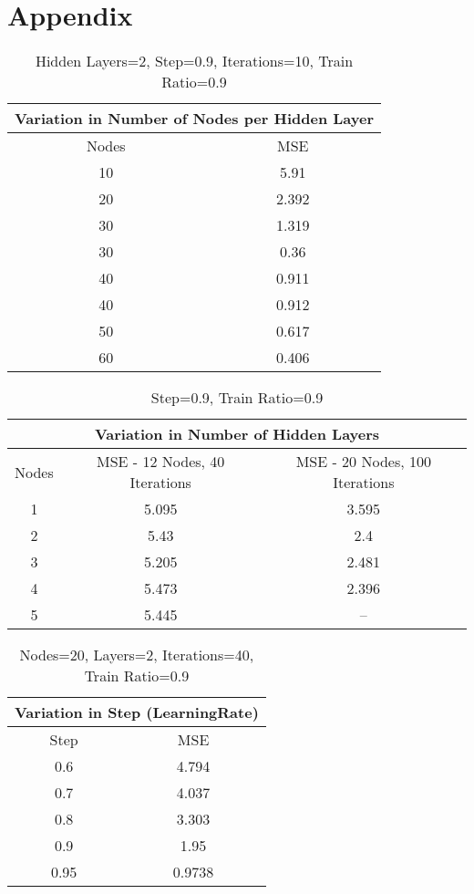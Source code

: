\documentclass[a4paper,11pt]{article}
\begin{document}
\section{Appendix}
\begin{table}
\centering
\begin{tabular}{|c|c|}
\hline
\multicolumn{2}{|c|}{Variation in Number of Nodes per Hidden Layer }\\
\hline
Nodes & MSE\\ 
\hline
10 & 5.91\\ 
\hline
20 & 2.392\\ 
\hline
30 & 1.319\\ 
\hline
30 & 0.36\\ 
\hline
40 & 0.911\\ 
\hline
40 & 0.912\\ 
\hline
50 & 0.617\\ 
\hline
60 & 0.406\\ 
\hline
\hline\end{tabular}
\label{table:table}
\caption{\small{Hidden Layers=2, Step=0.9, Iterations=10, Train Ratio=0.9 }} 
\end{table}


\begin{table}
\centering
\begin{tabular}{|c|c|c|}
\hline
\multicolumn{3}{|c|}{Variation in Number of Hidden Layers}\\ 
\hline
Nodes & MSE - 12 Nodes, 40 Iterations & MSE - 20 Nodes, 100 Iterations\\ 
\hline
1 & 5.095 & 3.595\\ 
\hline
2 & 5.43 & 2.4\\ 
\hline
3 & 5.205 & 2.481\\ 
\hline
4 & 5.473 & 2.396\\ 
\hline
5 & 5.445 & --\\ 
\hline
\hline\end{tabular}
\label{table:table}
\caption{\small{Step=0.9, Train Ratio=0.9 }} 
\end{table}


\begin{table}
\centering
\begin{tabular}{|c|c|}
\hline
\multicolumn{2}{|c|}{Variation in Step (LearningRate)}\\ 
\hline
Step & MSE\\ 
\hline
0.6 & 4.794\\ 
\hline
0.7 & 4.037\\ 
\hline
0.8 & 3.303\\ 
\hline
0.9 & 1.95\\ 
\hline
0.95 & 0.9738\\ 
\hline
\hline\end{tabular}
\label{table:table}
\caption{\small{Nodes=20, Layers=2, Iterations=40, Train Ratio=0.9 }} 
\end{table}
\end{document}
